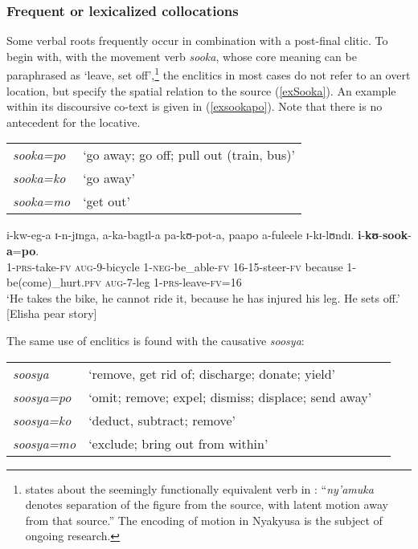 \subsubsection{Frequent or lexicalized collocations}\label{EnliticsFrequent}
Some verbal roots frequently occur in combination with a post-final clitic. To begin with, with the movement verb \textit{sooka}, whose core meaning can be paraphrased as `leave, set off',\footnote{\citet[66]{BotneR2005} states about the seemingly functionally equivalent verb in : ``\textit{ny'amuka} denotes separation of the figure from the source, with latent motion away from that source.'' The encoding of motion in Nyakyusa is the subject of ongoing research.} the  enclitics in most cases do not refer to an overt location, but specify the spatial relation to the source (\ref{exSooka}). An example within its discoursive co-text is given in (\ref{exsookapo}). Note that there is no antecedent for the locative.
\begin{exe}
	\ex\label{exSooka}
	\begin{tabular}[t]{>{\itshape}ll}
		\textit{sooka=po} & `go away; go off; pull out (train, bus)'\\
		\textit{sooka=ko} & `go away'\\
		\textit{sooka=mo} & `get out'
	\end{tabular}
	\ex \label{exsookapo} \gll i-kw-eg-a ɪ-n-jɪnga, a-ka-bagɪl-a pa-kʊ-pot-a, paapo a-fuleele ɪ-kɪ-lʊndɪ. \textbf{i}-\textbf{kʊ}-\textbf{sook}-\textbf{a}=\textbf{po}.\\
	1-\textsc{prs}-take-\textsc{fv} \textsc{aug}-9-bicycle 1-\textsc{neg}-be\_able-\textsc{fv} 16-15-steer-\textsc{fv} because 1-be(come)\_hurt.\textsc{pfv} \textsc{aug}-7-leg 1-\textsc{prs}-leave-\textsc{fv}=16\\
	\glt `He takes the bike, he cannot ride it, because he has injured his leg. He sets off.' [Elisha pear story]
\end{exe}

The same use of enclitics is found with the causative \textit{soosya}:
\begin{exe}
	\ex
	\begin{tabular}[t]{lll}
		\textit{soosya}&`remove, get rid of; discharge; donate; yield'\\
		\textit{soosya=po}&`omit; remove; expel; dismiss; displace; send away'\\ %
		\textit{soosya=ko}&`deduct, subtract; remove'\\
		\textit{soosya=mo}&`exclude; bring out from within'
	\end{tabular}
\end{exe}

